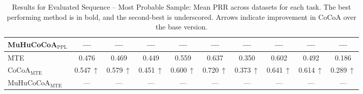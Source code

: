 \documentclass[11pt]{article}
\newcommand{\method}{MuHuCoCoA}
\begin{document}
\begin{table}[htbp]
{\begin{tabular}{l ccc ccc ccc}
\method{}$_{\mathrm{PPL}}$ & --- & --- & --- & --- & --- & --- & --- & --- & --- \\
\midrule
MTE & 0.476 & 0.469 & 0.449 & 0.559 & 0.637 & 0.350 & 0.602 & 0.492 & 0.186 \\
CoCoA$_{\mathrm{MTE}}$ & 0.547\,$\uparrow$ & 0.579\,$\uparrow$ & 0.451\,$\uparrow$ & 0.600\,$\uparrow$ & 0.720\,$\uparrow$ & 0.373\,$\uparrow$ & 0.641\,$\uparrow$ & 0.614\,$\uparrow$ & 0.289\,$\uparrow$ \\
\method{}$_{\mathrm{MTE}}$ & --- & --- & --- & --- & --- & --- & --- & --- & --- \\
\bottomrule
\end{tabular}%
}
\caption{Results for Evaluated Sequence -- Most Probable Sample: Mean PRR across datasets for each task. The best performing method is in bold, and the second-best is underscored. Arrows indicate improvement in CoCoA over the base version.}
\label{tab:cocoa_table3}
\end{table}
\end{document}
